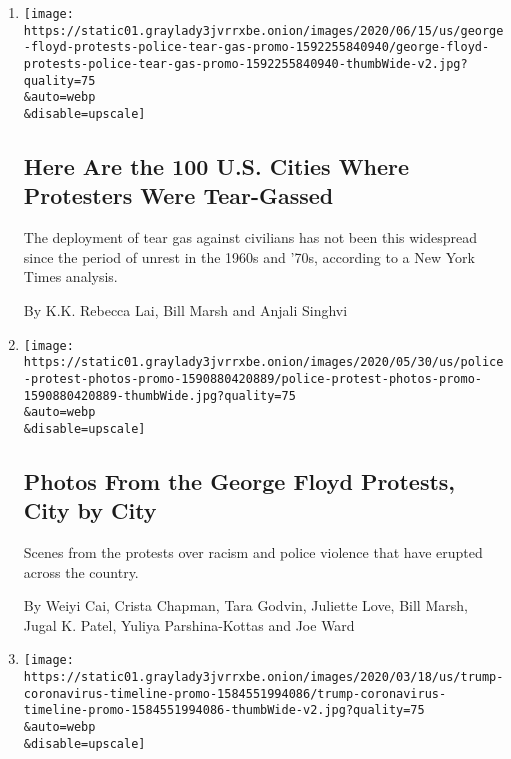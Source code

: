 \begin{enumerate}
\def\labelenumi{\arabic{enumi}.}
\item
  \href{/interactive/2020/06/16/us/george-floyd-protests-police-tear-gas.html}{}

  \texttt{[image: https://static01.graylady3jvrrxbe.onion/images/2020/06/15/us/george-floyd-protests-police-tear-gas-promo-1592255840940/george-floyd-protests-police-tear-gas-promo-1592255840940-thumbWide-v2.jpg?quality=75\\\&auto=webp\\\&disable=upscale]}

  \hypertarget{here-are-the-100-us-cities-where-protesters-were-tear-gassed}{%
  \subsection{Here Are the 100 U.S. Cities Where Protesters Were
  Tear-Gassed}\label{here-are-the-100-us-cities-where-protesters-were-tear-gassed}}

  The deployment of tear gas against civilians has not been this
  widespread since the period of unrest in the 1960s and '70s, according
  to a New York Times analysis.

  By K.K. Rebecca Lai, Bill Marsh and Anjali Singhvi
\item
  \href{/interactive/2020/05/30/us/george-floyd-protest-photos.html}{}

  \texttt{[image: https://static01.graylady3jvrrxbe.onion/images/2020/05/30/us/police-protest-photos-promo-1590880420889/police-protest-photos-promo-1590880420889-thumbWide.jpg?quality=75\\\&auto=webp\\\&disable=upscale]}

  \hypertarget{photos-from-the-george-floyd-protests-city-by-city}{%
  \subsection{Photos From the George Floyd Protests, City by
  City}\label{photos-from-the-george-floyd-protests-city-by-city}}

  Scenes from the protests over racism and police violence that have
  erupted across the country.

  By Weiyi Cai, Crista Chapman, Tara Godvin, Juliette Love, Bill Marsh,
  Jugal K. Patel, Yuliya Parshina-Kottas and Joe Ward
\item
  \href{/interactive/2020/03/18/us/trump-coronavirus-statements-timeline.html}{}

  \texttt{[image: https://static01.graylady3jvrrxbe.onion/images/2020/03/18/us/trump-coronavirus-timeline-promo-1584551994086/trump-coronavirus-timeline-promo-1584551994086-thumbWide-v2.jpg?quality=75\\\&auto=webp\\\&disable=upscale]}


\end{enumerate}
